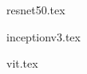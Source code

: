 \documentclass[
	article, %
	10pt, %
]{CSUniSchoolLabReport}
\begin{document}
{resnet50.tex}

{inceptionv3.tex}

{vit.tex}


\printbibliography %




\end{document}
